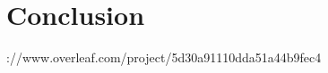 \documentclass[journal=jacsat,manuscript=article]{achemso}
\begin{document}
\section{Conclusion}



\begin{acknowledgement}

\end{acknowledgement}

\clearpage
\appendixhttps://www.overleaf.com/project/5d30a91110dda51a44b9fec4
\renewcommand{\thefigure}{S\arabic{figure}}
\setcounter{figure}{0}
\renewcommand{\thetable}{S\arabic{table}}
\setcounter{table}{0}

\begin{suppinfo}

\end{suppinfo}


\end{document}
